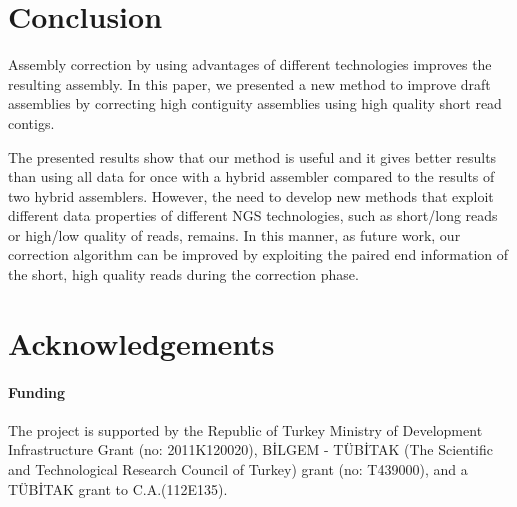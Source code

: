 \documentclass[12pt,a4paper]{cibb}
\begin{document}
\section{\bf Conclusion}

Assembly correction by using advantages of different technologies improves the resulting assembly. In this paper, we presented a new method to improve draft assemblies by correcting high contiguity assemblies using high quality short read contigs. 

The presented results show that our method is useful and it gives better results than using all data for once with a hybrid assembler compared to the results of two hybrid assemblers. However, the need to develop new methods that exploit different data properties of different NGS technologies, such as short/long reads or high/low quality of reads, remains. In this manner, as future work, our correction algorithm can be improved by exploiting the paired end information of the short, high quality reads during the correction phase.

\section*{\bf Acknowledgements}
\paragraph{Funding\textcolon}
The project is supported by the Republic of Turkey Ministry of Development Infrastructure Grant (no: 2011K120020), B\.{I}LGEM \-- T\"{U}B\.{I}TAK (The Scientific and Technological Research Council of Turkey) grant (no: T439000), and a T\"{U}B\.{I}TAK grant to C.A.(112E135).\\
\end{document}

